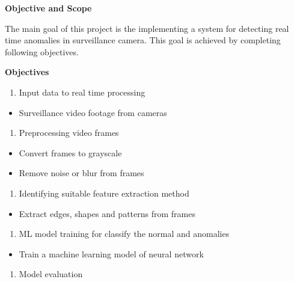 \documentclass[
]{article}
\begin{document}
\textbf{Objective and Scope}

The main goal of this project is the implementing a system for detecting
real time anomalies in surveillance camera. This goal is achieved by
completing following objectives.

\textbf{Objectives}

\begin{enumerate}
\def\labelenumi{\arabic{enumi}.}
\item
  Input data to real time processing
\end{enumerate}

\begin{itemize}
\item
  Surveillance video footage from cameras
\end{itemize}

\begin{enumerate}
\def\labelenumi{\arabic{enumi}.}
\setcounter{enumi}{1}
\item
  Preprocessing video frames
\end{enumerate}

\begin{itemize}
\item
  Convert frames to grayscale
\item
  Remove noise or blur from frames
\end{itemize}

\begin{enumerate}
\def\labelenumi{\arabic{enumi}.}
\setcounter{enumi}{2}
\item
  Identifying suitable feature extraction method
\end{enumerate}

\begin{itemize}
\item
  Extract edges, shapes and patterns from frames
\end{itemize}

\begin{enumerate}
\def\labelenumi{\arabic{enumi}.}
\setcounter{enumi}{3}
\item
  ML model training for classify the normal and anomalies
\end{enumerate}

\begin{itemize}
\item
  Train a machine learning model of neural network
\end{itemize}

\begin{enumerate}
\def\labelenumi{\arabic{enumi}.}
\setcounter{enumi}{4}
\item
  Model evaluation
\end{enumerate}
\end{document}
